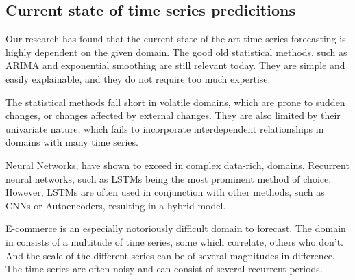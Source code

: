\subsection{Current state of time series predicitions}


Our research has found that the current state-of-the-art time series forecasting is highly dependent
on the given domain. The good old statistical methods, such as ARIMA and exponential smoothing 
are still relevant today. They are simple and easily explainable, and they do not require 
too much expertise.

The statistical methods fall short in volatile domains, which are prone to sudden changes,
or changes affected by external changes. They are also limited by their univariate nature, which fails to 
incorporate interdependent relationships in domains with many time series.

Neural Networks, have shown to exceed in complex data-rich, domains. Recurrent neural networks, such as LSTMs being the most
prominent method of choice. However, LSTMs are often used in conjunction with other methods, such as CNNs or Autoencoders,
resulting in a hybrid model.

E-commerce is an especially notoriously difficult domain to forecast. The domain in consists of a multitude of time series,
some which correlate, others who don't. And the scale of the different series can be of several magnitudes in difference.
The time series are often noisy and can consist of several recurrent periods.

